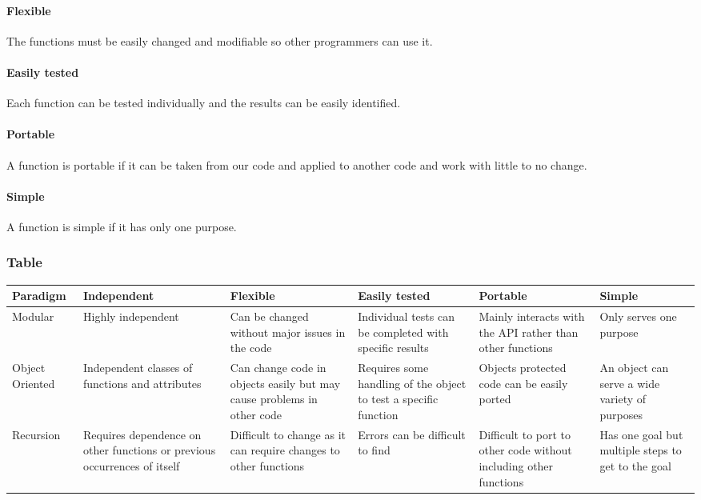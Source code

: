 \paragraph{Flexible}
The functions must be easily changed and modifiable so other programmers can use it.

\paragraph{Easily tested}
Each function can be tested individually and the results can be easily identified.

\paragraph{Portable}
A function is portable if it can be taken from our code and applied to another code and work with little to no change.

\paragraph{Simple}
A function is simple if it has only one purpose.

\subsubsection{Table}
\begin{center}
\begin{tabular}{ ||B|M|M|M|M|M|| } 
\hline
Paradigm & Independent & Flexible & Easily tested & Portable & Simple \\
 \hline
 Modular & Highly independent & Can be changed without major issues in the code & Individual tests can be completed with specific results & Mainly interacts with the API rather than other functions & Only serves one purpose\\ 
 \hline
 Object Oriented & Independent classes of functions and attributes & Can change code in objects easily but may cause problems in other code & Requires some handling of the object to test a specific function & Objects protected code can be easily ported & An object can serve a wide variety of purposes\\ 
 \hline
 Recursion & Requires dependence on other functions or previous occurrences of itself & Difficult to change as it can require changes to other functions & Errors can be difficult to find  & Difficult to port to other code without including other functions & Has one goal but multiple steps to get to the goal\\ 
 \hline
\end{tabular}
\end{center}


